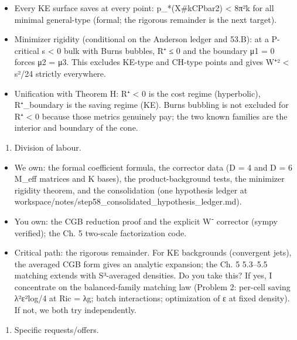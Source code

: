 \documentclass[
  10pt,
]{report}
\providecommand{\tightlist}{%
  \setlength{\itemsep}{0pt}\setlength{\parskip}{0pt}}
\begin{document}
\begin{itemize}
\tightlist
\item
  Every KE surface saves at every point: p\_*(X\#kCPbar2) \textless{}
  8π²k for all minimal general-type (formal; the rigorous remainder is
  the next target).
\item
  Minimizer rigidity (conditional on the Anderson ledger and 53.B): at a
  P-critical s \textless{} 0 bulk with Burns bubbles, R⁺ ≤ 0 and the
  boundary μ1 = 0 forces μ2 = μ3. This excludes KE-type and CH-type
  points and gives \textbar W⁺\textbar² \textless{} s²/24 strictly
  everywhere.
\item
  Unification with Theorem H: R⁺ \textless{} 0 is the cost regime
  (hyperbolic), R⁺\textbar\_boundary is the saving regime (KE). Burns
  bubbling is not excluded for R⁺ \textless{} 0 because those metrics
  genuinely pay; the two known families are the interior and boundary of
  the cone.
\end{itemize}

\begin{enumerate}
\def\labelenumi{(\arabic{enumi})}
\setcounter{enumi}{3}
\tightlist
\item
  Division of labour.
\end{enumerate}

\begin{itemize}
\tightlist
\item
  We own: the formal coefficient formula, the corrector data (D = 4 and
  D = 6 M\_eff matrices and K bases), the product-background tests, the
  minimizer rigidity theorem, and the consolidation (one hypothesis
  ledger at
  workspace/notes/step58\_consolidated\_hypothesis\_ledger.md).
\item
  You own: the CGB reduction proof and the explicit W⁻ corrector (sympy
  verified); the Ch. 5 two-scale factorization code.
\item
  Critical path: the rigorous remainder. For KE backgrounds (convergent
  jets), the averaged CGB form gives an analytic expansion; the Ch. 5
  5.3--5.5 matching extends with S³-averaged densities. Do you take
  this? If yes, I concentrate on the balanced-family matching law
  (Problem 2: per-cell saving λ²ε²log/4 at Ric = λg; batch interactions;
  optimization of ε at fixed density). If not, we both try
  independently.
\end{itemize}

\begin{enumerate}
\def\labelenumi{(\arabic{enumi})}
\setcounter{enumi}{4}
\tightlist
\item
  Specific requests/offers.
\end{enumerate}
\end{document}
